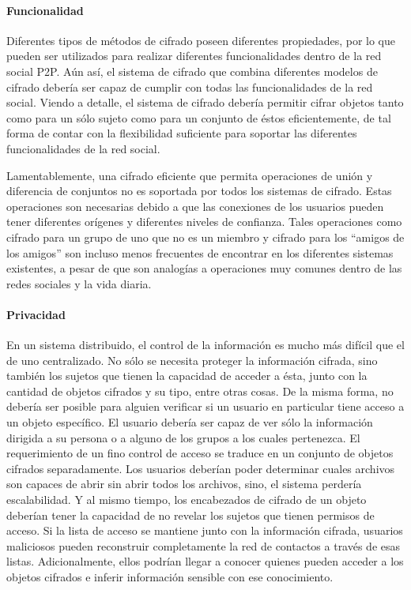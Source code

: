     \paragraph{Funcionalidad}
    Diferentes tipos de métodos de cifrado poseen diferentes propiedades, por
    lo que pueden ser utilizados para realizar diferentes funcionalidades dentro de
    la red social P2P. Aún así, el sistema de cifrado que combina diferentes
    modelos de cifrado debería ser capaz de cumplir con todas las
    funcionalidades de la red social. 
    Viendo a detalle, el sistema de cifrado debería permitir
    cifrar objetos tanto como para un sólo sujeto como para un conjunto de éstos
    eficientemente, de tal forma de contar con la flexibilidad suficiente para
    soportar las diferentes funcionalidades de la red social.
    
    Lamentablemente, una cifrado eficiente que permita operaciones de unión
    y diferencia de conjuntos no es soportada por todos los sistemas
    de cifrado. Estas operaciones son necesarias debido a que las conexiones
    de los usuarios pueden tener diferentes orígenes y diferentes niveles de
    confianza. Tales operaciones como cifrado para un grupo de uno que no es
    un miembro y cifrado para los ``amigos de los amigos'' son incluso menos
    frecuentes de encontrar en los diferentes sistemas existentes, a pesar de que
    son analogías a operaciones muy comunes dentro de las redes sociales y la vida
    diaria.
    
    
    \paragraph{Privacidad}
    En un sistema distribuido, el control de la información es mucho más difícil
    que el de uno centralizado. No sólo se necesita proteger la información
    cifrada, sino también los sujetos que tienen la capacidad de acceder a ésta,
    junto con la cantidad de objetos cifrados y su tipo, entre otras cosas. De la misma
    forma, no debería ser posible para alguien verificar si un usuario en
    particular tiene acceso a un objeto específico. El usuario debería ser capaz de
    ver sólo la información dirigida a su persona o a alguno de los grupos a los
    cuales pertenezca. El requerimiento de un fino control de acceso se traduce en un
    conjunto de objetos cifrados separadamente. Los usuarios deberían poder
    determinar cuales archivos son capaces de abrir sin abrir todos los archivos,
    sino, el sistema perdería escalabilidad. Y al mismo tiempo, los encabezados de
    cifrado de un objeto deberían tener la capacidad de no revelar los
    sujetos que tienen permisos de acceso. Si la lista de acceso se mantiene junto
    con la información cifrada, usuarios maliciosos pueden reconstruir
    completamente la red de contactos a través de esas listas. Adicionalmente,
    ellos podrían llegar a conocer quienes pueden acceder a los objetos
    cifrados e inferir información sensible con ese conocimiento.
    
